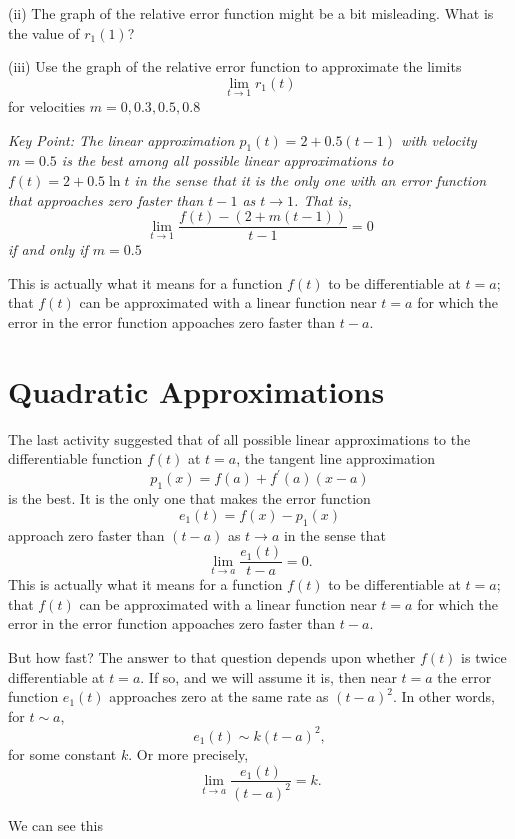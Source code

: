 \documentclass{ximera}
\begin{document}
\begin{exploration}
\begin{question}
(ii) The graph of the relative error function might be a bit misleading. What is the value of $r_1(1)$?

(iii) Use the graph of the relative error function to approximate the limits
\[
    \lim_{t\to 1}r_1(t) 
\]
for velocities $m=0, 0.3, 0.5, 0.8$
\end{question}

\it{Key Point:} The linear approximation $p_1(t)=2+0.5(t-1)$ with velocity $m=0.5$ is the best among all possible linear approximations to $f(t)=2+0.5\ln t$ in the sense that it is the \emph{only} one with an error function that approaches zero faster than $t-1$ as $t\to 1$. That is,
\[
          \lim_{t\to 1} \frac{f(t) - (2 + m(t-1))}{t-1} = 0
\]
if and only if $m=0.5$

This is actually what it means for a function $f(t)$ to be differentiable at $t=a$; that $f(t)$ can be approximated with a linear function near $t=a$ for which the error in the error function appoaches zero faster than $t-a$. 




\end{exploration}




\section{Quadratic Approximations}
The last activity suggested that of all possible linear approximations to the differentiable function $f(t)$ at $t=a$, the tangent line approximation
\[
 p_1(x) = f(a) + f^\prime(a)(x-a)
\]
is the best. It is the only one that makes the error function
\[
   e_1(t) = f(x) - p_1(x)
\]
approach zero faster than $(t-a)$ as $t\to a$ in the sense that
\[
   \lim_{t\to a} \frac{e_1(t)}{t-a} = 0 .
\]
This is actually what it means for a function $f(t)$ to be differentiable at $t=a$; that $f(t)$ can be approximated with a linear function near $t=a$ for which the error in the error function appoaches zero faster than $t-a$. 

But how fast? The answer to that question depends upon whether $f(t)$ is twice differentiable at $t=a$. If so, and we will assume it is, then near $t=a$ the error function $e_1(t)$ approaches zero at the same rate as $(t-a)^2$. In other words, for $t\sim a$,
\[
  e_1(t) \sim k (t-a)^2 ,
\]
for some constant $k$. Or more precisely, 
\[
   \lim_{t\to a} \frac{e_1(t)}{(t-a)^2} = k .
\]

We can see this
\end{document}
